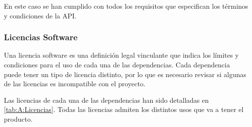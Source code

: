 \begin{table}[H]
    \label{A:last_terms}
    \caption{Términos y Condiciones más importantes de la API de LastFM}
\end{table}
En este caso se han cumplido con todos los requisitos que especifican los términos y condiciones de la API. 

\subsubsection{Licencias Software}
Una licencia software es una definición legal vinculante que indica los límites y condiciones para el uso de cada una de las dependencias. Cada dependencia puede tener un tipo de licencia distinto, por lo que es necesario revisar si algunas de las licencias es incompatible con el proyecto. 

Las licencias de cada una de las dependencias han sido detalladas en \ref{tab:A:Licencias}. Todas las licencias admiten los distintos usos que va a tener el producto.  

